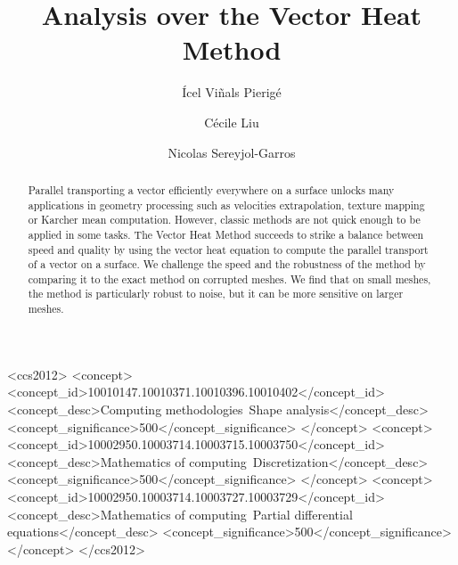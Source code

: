 \documentclass[sigconf, nonacm]{acmart}
\begin{document}
\title{Analysis over the Vector Heat Method}

\author{Ícel Viñals Pierigé}

\author{Cécile Liu}

\author{Nicolas Sereyjol-Garros}


\begin{abstract}
  Parallel transporting a vector efficiently everywhere on a surface unlocks many applications in geometry processing such as velocities extrapolation, texture mapping or Karcher mean computation. However, classic methods are not quick enough to be applied in some tasks. The Vector Heat Method succeeds to strike a balance between speed and quality by using the vector heat equation to compute the parallel transport of a vector on a surface. We challenge the speed and the robustness of the method by comparing it to the exact method on corrupted meshes. We find that on small meshes, the method is particularly robust to noise, but it can be more sensitive on larger meshes.
\end{abstract}

\begin{CCSXML}
<ccs2012>
   <concept>
       <concept_id>10010147.10010371.10010396.10010402</concept_id>
       <concept_desc>Computing methodologies~Shape analysis</concept_desc>
       <concept_significance>500</concept_significance>
       </concept>
   <concept>
       <concept_id>10002950.10003714.10003715.10003750</concept_id>
       <concept_desc>Mathematics of computing~Discretization</concept_desc>
       <concept_significance>500</concept_significance>
       </concept>
   <concept>
       <concept_id>10002950.10003714.10003727.10003729</concept_id>
       <concept_desc>Mathematics of computing~Partial differential equations</concept_desc>
       <concept_significance>500</concept_significance>
       </concept>
 </ccs2012>
\end{CCSXML}
\end{document}
